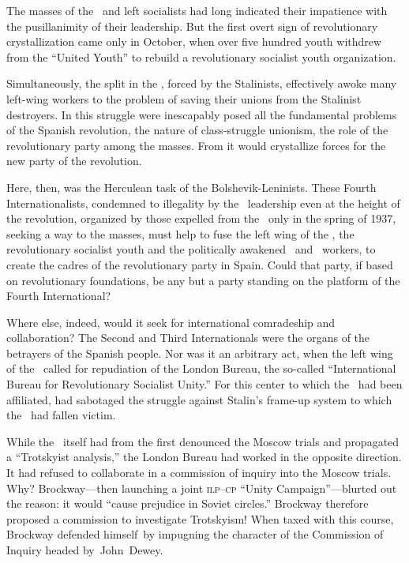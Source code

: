 \begin{sloppypar}
  The masses of the \UGT\ and left socialists had long indicated their impatience with the pusillanimity of their leadership. But the first overt sign of revolutionary crystallization came only in October, when over five hundred youth withdrew from the ``United Youth'' to rebuild a revolutionary socialist youth organization.
\end{sloppypar}

Simultaneously, the split in the \UGT\kn, forced by the Stalinists, effectively awoke many left-wing workers to the problem of saving their unions from the Stalinist destroyers. In this struggle were inescapably posed all the fundamental problems of the Spanish revolution, the nature of class-struggle unionism, the role of the revolutionary party among the masses. From it would crystallize forces for the new party of the revolution.

Here, then, was the Herculean task of the Bolshevik-Leninists. These Fourth Internationalists, condemned to illegality by the \POUM\ leadership even at the height of the revolution, organized by those expelled from the \POUM\ only in the spring of 1937, seeking a way to the masses, must help to fuse the left wing of the \POUM\kn, the revolutionary socialist youth and the politically awakened \CNT\ and \UGT\ workers, to create the cadres of the revolutionary party in Spain. Could that party, if based on revolutionary foundations, be any but a party standing on the platform of the Fourth International?

Where else, indeed, would it seek for international comradeship and collaboration? The Second and Third Internationals were the organs of the betrayers of the Spanish people. Nor was it an arbitrary act, when the left wing of the \POUM\ called for repudiation of the London Bureau, the so-called ``International Bureau for Revolutionary Socialist Unity.'' For this center to which the \POUM\ had been affiliated, had sabotaged the struggle against Stalin’s frame-up system to which the \POUM\ had fallen victim.

\begin{sloppypar}
  While the \POUM\ itself had from the first denounced the Moscow trials and propagated a ``Trotskyist analysis,'' the London Bureau had worked in the opposite direction. It had refused to collaborate in a commission of inquiry into the Moscow trials. Why? Brockway—then launching a joint \textsc{ilp–cp} ``Unity Campaign''—blurted out the reason: it would ``cause prejudice in Soviet circles.''
  Brockway therefore proposed \hspace{1pt}\textls[-40]{\dots} a commission to investigate Trotskyism! When taxed with this course, Brockway defended himself~by impugning the character of the Commission of Inquiry headed by~John~Dewey.
\end{sloppypar}

